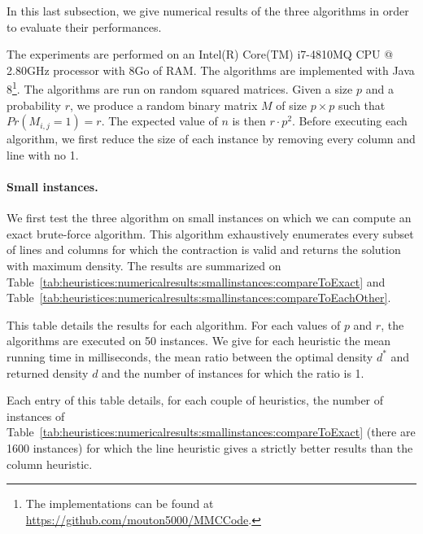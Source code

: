 In this last subsection, we give numerical results of the three algorithms in order to evaluate their performances.

The experiments are performed on an Intel(R) Core(TM) i7-4810MQ CPU @ 2.80GHz processor with 8Go of RAM. The algorithms are implemented with Java 8\footnote{The implementations can be found at \url{https://github.com/mouton5000/MMCCode}.}. The algorithms are run on random squared matrices. Given a size $p$ and a probability $r$, we produce a random binary matrix $M$ of size $p \times p$ such that $Pr(M_{i,j} = 1) = r$. The expected value of $n$ is then $r \cdot p^2$. Before executing each algorithm, we first reduce the size of each instance by removing every column and line with no 1.

\paragraph{Small instances. }
We first test the three algorithm on small instances on which we can compute an exact brute-force algorithm. This algorithm exhaustively enumerates every subset of lines and columns for which the contraction is valid and returns the solution with maximum density. The results are summarized on Table~\ref{tab:heuristices:numericalresults:smallinstances:compareToExact} and  Table~\ref{tab:heuristices:numericalresults:smallinstances:compareToEachOther}.


\begin{table}[ht!]
	\centering
	\def\arraystretch{1.2}
	\setlength\tabcolsep{0.075cm}
	\scriptsize
	\caption{This table details the results for each algorithm. For each values of $p$ and $r$, the algorithms are executed on 50 instances. We give for each heuristic the mean running time in milliseconds, the mean ratio between the optimal density $d^*$ and returned density $d$ and the number of instances for which the ratio is 1.}
	
	\label{tab:heuristices:numericalresults:smallinstances:compareToExact}
\end{table}

\begin{table}[ht!]
	\centering
	\def\arraystretch{1.2}
	\setlength\tabcolsep{0.075cm}
	\scriptsize
	\caption{Each entry of this table details, for each couple of heuristics, the number of instances of Table~\ref{tab:heuristices:numericalresults:smallinstances:compareToExact} (there are 1600 instances) for which the line heuristic gives a strictly better results than the column heuristic. }
	
	\label{tab:heuristices:numericalresults:smallinstances:compareToEachOther}
\end{table}

